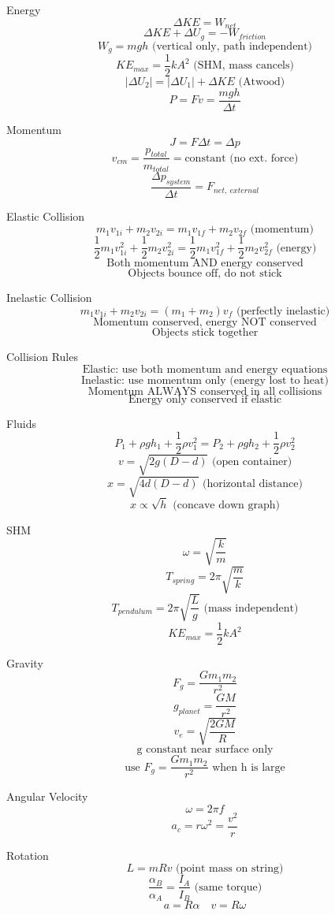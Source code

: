 Energy
$$\Delta KE = W_{net}$$
$$\Delta KE + \Delta U_g = -W_{friction}$$
$$W_g = mgh \text{ (vertical only, path independent)}$$
$$KE_{max} = \frac{1}{2}kA^2 \text{ (SHM, mass cancels)}$$
$$|\Delta U_2| = |\Delta U_1| + \Delta KE \text{ (Atwood)}$$
$$P = Fv = \frac{mgh}{\Delta t}$$

Momentum
$$J = F\Delta t = \Delta p$$
$$v_{cm} = \frac{p_{total}}{m_{total}} = \text{constant (no ext. force)}$$
$$\frac{\Delta p_{system}}{\Delta t} = F_{net,\ external}$$

Elastic Collision
$$m_1v_{1i} + m_2v_{2i} = m_1v_{1f} + m_2v_{2f} \text{ (momentum)}$$
$$\frac{1}{2}m_1v_{1i}^2 + \frac{1}{2}m_2v_{2i}^2 = \frac{1}{2}m_1v_{1f}^2 + \frac{1}{2}m_2v_{2f}^2 \text{ (energy)}$$
$$\text{Both momentum AND energy conserved}$$
$$\text{Objects bounce off, do not stick}$$

Inelastic Collision
$$m_1v_{1i} + m_2v_{2i} = (m_1+m_2)v_f \text{ (perfectly inelastic)}$$
$$\text{Momentum conserved, energy NOT conserved}$$
$$\text{Objects stick together}$$

Collision Rules
$$\text{Elastic: use both momentum and energy equations}$$
$$\text{Inelastic: use momentum only (energy lost to heat)}$$
$$\text{Momentum ALWAYS conserved in all collisions}$$
$$\text{Energy only conserved if elastic}$$

Fluids
$$P_1 + \rho gh_1 + \frac{1}{2}\rho v_1^2 = P_2 + \rho gh_2 + \frac{1}{2}\rho v_2^2$$
$$v = \sqrt{2g(D-d)} \text{ (open container)}$$
$$x = \sqrt{4d(D-d)} \text{ (horizontal distance)}$$
$$x \propto \sqrt{h} \text{ (concave down graph)}$$

SHM
$$\omega = \sqrt{\frac{k}{m}}$$
$$T_{spring} = 2\pi\sqrt{\frac{m}{k}}$$
$$T_{pendulum} = 2\pi\sqrt{\frac{L}{g}} \text{ (mass independent)}$$
$$KE_{max} = \frac{1}{2}kA^2$$

Gravity
$$F_g = \frac{Gm_1m_2}{r^2}$$
$$g_{planet} = \frac{GM}{r^2}$$
$$v_e = \sqrt{\frac{2GM}{R}}$$
$$\text{g constant near surface only}$$
$$\text{use } F_g = \frac{Gm_1m_2}{r^2} \text{ when h is large}$$

Angular Velocity
$$\omega = 2\pi f$$
$$a_c = r\omega^2 = \frac{v^2}{r}$$

Rotation
$$L = mRv \text{ (point mass on string)}$$
$$\frac{\alpha_B}{\alpha_A} = \frac{I_A}{I_B} \text{ (same torque)}$$
$$a = R\alpha \quad v = R\omega$$
